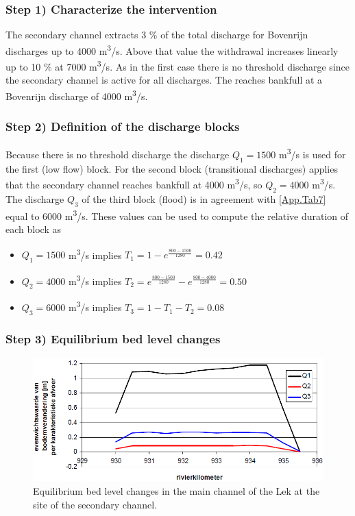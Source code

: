 \subsubsection*{Step 1) Characterize the intervention}

The secondary channel extracts 3 \% of the total discharge for Bovenrijn discharges up to 4000 m\textsuperscript{3}/s.
Above that value the withdrawal increases linearly up to 10 \% at 7000 m\textsuperscript{3}/s.
As in the first case there is no threshold discharge since the secondary channel is active for all discharges.
The reaches bankfull at a Bovenrijn discharge of 4000 m\textsuperscript{3}/s.

\subsubsection*{Step 2) Definition of the discharge blocks}

Because there is no threshold discharge the discharge $Q_1 = 1500$ m\textsuperscript{3}/s is used for the first (low flow) block.
For the second block (transitional discharges) applies that the secondary channel reaches bankfull at 4000 m\textsuperscript{3}/s, so $Q_2 = 4000$ m\textsuperscript{3}/s.
The discharge $Q_3$ of the third block (flood) is in agreement with \autoref{App.Tab7} equal to 6000 m\textsuperscript{3}/s.
These values can be used to compute the relative duration of each block as

\begin{itemize}
\item $Q_1=1500$ m\textsuperscript{3}/s implies $T_1 = 1-e^{\frac{800-1500}{1280}} = 0.42$
\item $Q_2=4000$ m\textsuperscript{3}/s implies $T_2 = e^{\frac{800-1500}{1280}} - e^{\frac{800-4000}{1280}} = 0.50$
\item $Q_3=6000$ m\textsuperscript{3}/s implies $T_3 = 1-T_1-T_2 = 0.08$
\end{itemize}

\subsubsection*{Step 3) Equilibrium bed level changes}

\begin{figure}
\includegraphics[width=\columnwidth]{figures/Fig11.png}
\caption{Equilibrium bed level changes in the main channel of the Lek at the site of the secondary channel.}
\label{App.Fig11}
\end{figure}

